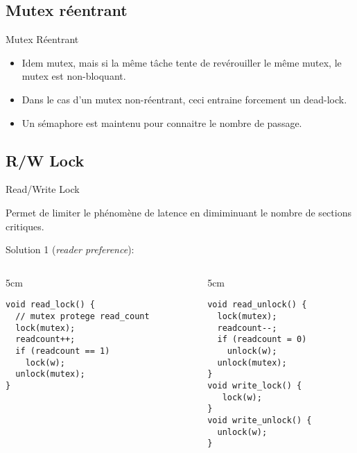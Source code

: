 \subsection{Mutex réentrant}

\begin{frame}{Mutex Réentrant}
  \begin{itemize} 
  \item Idem  mutex, mais  si la même  tâche tente de  revérouiller le
    même mutex, le mutex est non-bloquant.
  \item Dans le cas  d'un mutex non-réentrant, ceci entraine forcement
    un dead-lock.
  \item  Un sémaphore est maintenu pour connaitre le
    nombre de passage.
  \end{itemize} 
\end{frame} 

\subsection{R/W Lock}

\begin{frame}[fragile]{Read/Write Lock}

Permet de limiter le phénomène  de latence en dimiminuant le nombre de
sections critiques.

Solution 1 (\emph{reader preference}):
\begin{columns}
  \begin{column} {5cm}
    \begin{lstlisting} 
void read_lock() {
  // mutex protege read_count
  lock(mutex);
  readcount++;
  if (readcount == 1)
    lock(w);
  unlock(mutex);
}
    \end{lstlisting} 
  \end{column}
  \begin{column} {5cm}
    \begin{lstlisting} 
void read_unlock() {
  lock(mutex);
  readcount--;
  if (readcount = 0)
    unlock(w);
  unlock(mutex);
}
void write_lock() {
   lock(w);
}
void write_unlock() {
  unlock(w);
}
    \end{lstlisting} 
  \end{column}
\end{columns}
\end{frame} 

